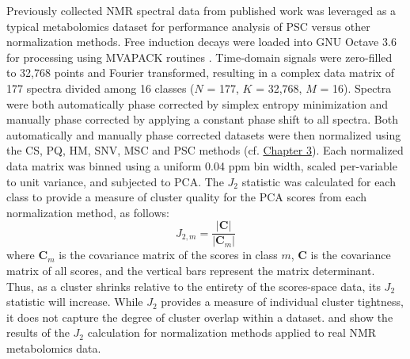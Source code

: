 \begin{doublespace}
Previously collected \hnmr{} NMR spectral data from published work
\cite{halouska:acscb2012} was leveraged as a typical metabolomics dataset
for performance analysis of PSC versus other normalization methods. Free
induction decays were loaded into GNU Octave 3.6 \cite{eaton2008} for
processing using MVAPACK routines \cite{worley:acscb2014}. Time-domain signals
were zero-filled to 32,768 points and Fourier transformed, resulting in
a complex data matrix of 177 spectra divided among 16 classes
($N$ = 177, $K$ = 32,768, $M$ = 16). Spectra were both automatically phase
corrected by simplex entropy minimization \cite{chen:jmr2002} and manually
phase corrected by applying a constant phase shift to all spectra. Both
automatically and manually phase corrected datasets were then normalized using
the CS, PQ, HM, SNV, MSC and PSC methods
(cf. \hyperlink{subsection.3.4.3}{Chapter 3}).
Each normalized data matrix was binned using a uniform 0.04 ppm bin width,
scaled per-variable to unit variance, and subjected to PCA. The $J_2$ statistic
\cite{koutroumbas2006} was calculated for each class to provide a measure of
cluster quality for the PCA scores from each normalization method, as follows:
\begin{equation}
J_{2,m} = \frac{|\mathbf{C}|}{|\mathbf{C}_m|}
\end{equation}
where $\mathbf{C}_m$ is the covariance matrix of the scores in class $m$,
$\mathbf{C}$ is the covariance matrix of all scores, and the vertical bars
represent the matrix determinant. Thus, as a cluster shrinks relative to the
entirety of the scores-space data, its $J_2$ statistic will increase. While
$J_2$ provides a measure of individual cluster tightness, it does not capture
the degree of cluster overlap within a dataset.  and
 show the results of the $J_2$ calculation for normalization
methods applied to real \hnmr{} NMR metabolomics data.
\end{doublespace}

